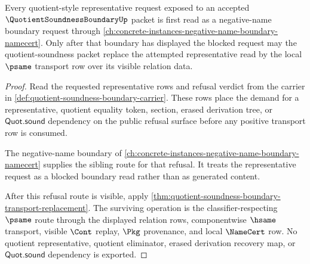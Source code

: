 \begin{theorem}
\label{thm:quotient-soundness-boundary-negative-boundary-route}
Every quotient-style representative request exposed to an accepted $\QuotientSoundnessBoundaryUp$ packet is first read as a negative-name boundary request through \autoref{ch:concrete-instances-negative-name-boundary-namecert}. Only after that boundary has displayed the blocked request may the quotient-soundness packet replace the attempted representative read by the local $\psame$ transport row over its visible relation data.
\end{theorem}
\begin{proof}
Read the requested representative rows and refusal verdict from the carrier in \autoref{def:quotient-soundness-boundary-carrier}. These rows place the demand for a representative, quotient equality token, section, erased derivation tree, or $\mathsf{Quot.sound}$ dependency on the public refusal surface before any positive transport row is consumed.

The negative-name boundary of \autoref{ch:concrete-instances-negative-name-boundary-namecert} supplies the sibling route for that refusal. It treats the representative request as a blocked boundary read rather than as generated content.

After this refusal route is visible, apply \autoref{thm:quotient-soundness-boundary-transport-replacement}. The surviving operation is the classifier-respecting $\psame$ route through the displayed relation rows, componentwise $\hsame$ transport, visible $\Cont$ replay, $\Pkg$ provenance, and local $\NameCert$ row. No quotient representative, quotient eliminator, erased derivation recovery map, or $\mathsf{Quot.sound}$ dependency is exported.
\end{proof}


